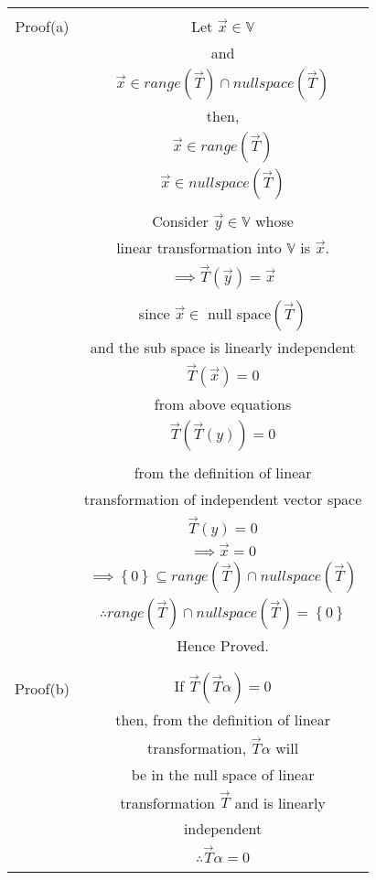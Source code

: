 \begin{table}[h!]
\begin{center}
\begin{tabular}{|c|c|}
\hline
& \\
Proof(a) & Let $\vec{x} \in \mathbb{V}$\\
& and \\
& $\vec{x} \in range(\vec{T}) \cap null space(\vec{T})$\\
& then,\\
& $\vec{x} \in range(\vec{T})$\\
& $\vec{x} \in null space(\vec{T})$\\
& \\
& Consider $\vec{y} \in \mathbb{V}$ whose\\
& linear transformation into $\mathbb{V}$ is $\vec{x}$.\\
& $\implies \vec{T}(\vec{y}) = \vec{x}$\\
& \\
& since $\vec{x} \in $ null space$(\vec{T})$ \\
& and the sub space is linearly independent \\
& $\vec{T}(\vec{x}) = 0$\\
& from above equations \\
& $\vec{T}(\vec{T}(y)) = 0$\\
& \\
& from the definition of linear\\
& transformation of independent vector space\\
& $\vec{T}(y) = 0$\\
& $\implies \vec{x} = 0$\\
& $\implies \left\lbrace 0 \right\rbrace \subseteq range(\vec{T}) \cap null space(\vec{T})$ \\
& $\therefore range(\vec{T}) \cap null space(\vec{T}) = \left\lbrace 0 \right\rbrace$\\
& Hence Proved.\\
& \\
\hline
& \\
Proof(b) & If $\vec{T}(\vec{T}\alpha) = 0$\\
& then, from the definition of linear\\
& transformation, $\vec{T}\alpha$ will \\
& be in the null space of linear \\
& transformation $\vec{T}$ and is linearly \\
& independent \\
& $\therefore \vec{T}\alpha = 0$\\
& \\
\hline
\end{tabular}
\end{center}
\end{table}

